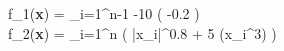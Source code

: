 f_1(\textbf{x}) = \sum_{i=1}^{n-1} -10 \exp \left( -0.2  \right) \\
f_2(\textbf{x}) = \sum_{i=1}^{n} \left( |x_i|^{0.8} + 5 \sin(x_i^3) \right)
